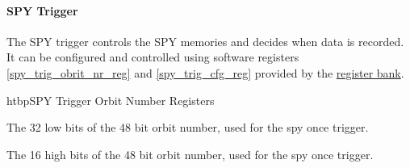 \paragraph{SPY Trigger}\label{sec:spy_trigger}
The SPY trigger controls the SPY memories and decides when data is recorded. It can be configured and controlled using
software registers \ref{spy_trig_obrit_nr_reg} and \ref{spy_trig_cfg_reg} provided by the \hyperref[sec_rb]{register bank}.

\begin{register}{htbp}{SPY Trigger Orbit Number Registers}{}%
	\label{spy_trig_obrit_nr_reg}
	\begin{regdesc}
	\begin{reglist}
		\item [orbit\_nr\_low] The 32 low bits of the 48 bit orbit number, used for the spy once trigger.
		\item [orbit\_nr\_high] The 16 high bits of the 48 bit orbit number, used for the spy once trigger.
	\end{reglist}
	\end{regdesc}
\end{register}

